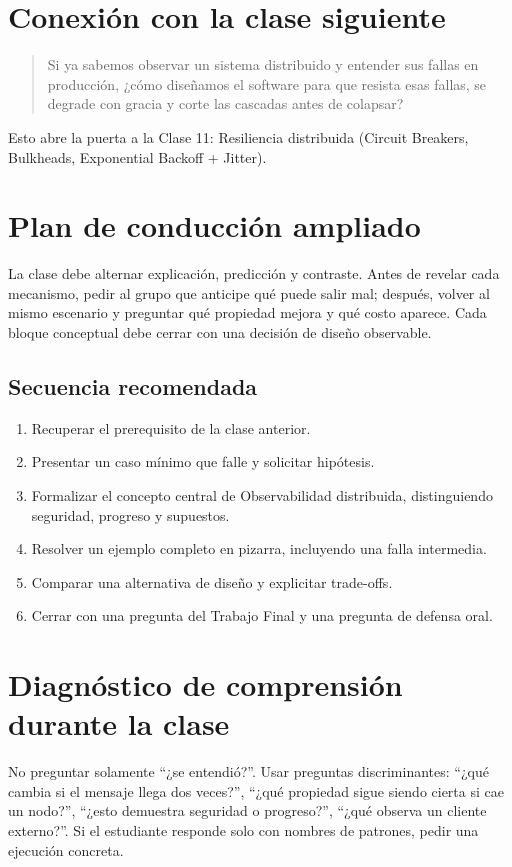 \documentclass[variant=docente,cover=institutional,mode=screen]{ua-engineering-v6-article}
\begin{document}
\section{Conexión con la clase siguiente}

\begin{quote}
Si ya sabemos observar un sistema distribuido y entender sus fallas en producción, ¿cómo diseñamos el software para que resista esas fallas, se degrade con gracia y corte las cascadas antes de colapsar?
\end{quote}

Esto abre la puerta a la Clase 11: Resiliencia distribuida (Circuit Breakers, Bulkheads, Exponential Backoff + Jitter).


\section{Plan de conducción ampliado}
La clase debe alternar explicación, predicción y contraste. Antes de revelar cada mecanismo, pedir al grupo que anticipe qué puede salir mal; después, volver al mismo escenario y preguntar qué propiedad mejora y qué costo aparece. Cada bloque conceptual debe cerrar con una decisión de diseño observable.
\subsection*{Secuencia recomendada}
\begin{enumerate}
\item Recuperar el prerequisito de la clase anterior.
\item Presentar un caso mínimo que falle y solicitar hipótesis.
\item Formalizar el concepto central de Observabilidad distribuida, distinguiendo seguridad, progreso y supuestos.
\item Resolver un ejemplo completo en pizarra, incluyendo una falla intermedia.
\item Comparar una alternativa de diseño y explicitar trade-offs.
\item Cerrar con una pregunta del Trabajo Final y una pregunta de defensa oral.
\end{enumerate}
\section{Diagnóstico de comprensión durante la clase}
No preguntar solamente ``¿se entendió?''. Usar preguntas discriminantes: ``¿qué cambia si el mensaje llega dos veces?'', ``¿qué propiedad sigue siendo cierta si cae un nodo?'', ``¿esto demuestra seguridad o progreso?'', ``¿qué observa un cliente externo?''. Si el estudiante responde solo con nombres de patrones, pedir una ejecución concreta.
\end{document}

